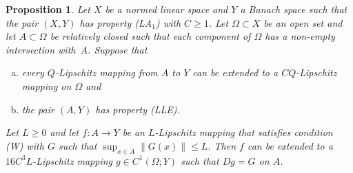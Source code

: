 \documentclass[a4paper,twoside,10pt,reqno,draft]{amsart}
\newtheorem{proposition}[theorem]{Proposition}
\theoremstyle{definition}
\theoremstyle{remark}
\newcommand\norm[1]{\mathopen\|#1\mathclose\|}
\newcommand\Om{\Omega}
\newcommand\pLA[1]{(LA$_#1$)}
\newcommand\pLLE{(LLE)}
\newcommand\cW{(W)}
\begin{document}
\begin{proposition}\label{p:C1_Lip-ext}
Let $X$ be a normed linear space and $Y$ a Banach space such that the pair $(X,Y)$ has property \pLA1 with $C\ge1$.
Let $\Om\subset X$ be an open set and let $A\subset\Om$ be relatively closed such that each component of $\Om$ has a non-empty intersection with~$A$.
Suppose that
\begin{enumerate}[(a)]
\item every $Q$-Lipschitz mapping from $A$ to $Y$ can be extended to a $CQ$-Lipschitz mapping on $\Om$ and
\item the pair $(A,Y)$ has property \pLLE.
\end{enumerate}
Let $L\ge0$ and let $f\colon A\to Y$ be an $L$-Lipschitz mapping that satisfies condition {\cW} with $G$ such that $\sup_{x\in A}\norm{G(x)}\le L$.
Then $f$ can be extended to a $16C^3L$-Lipschitz mapping $g\in C^1(\Om;Y)$ such that $Dg=G$ on $A$.
\end{proposition}
\end{document}
